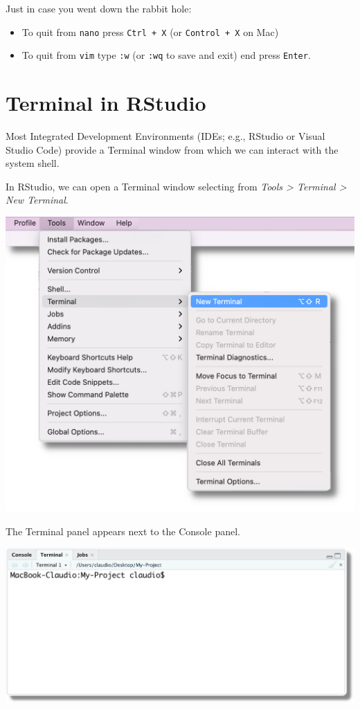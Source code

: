 \documentclass[
  11pt,
]{book}
\providecommand{\tightlist}{%
  \setlength{\itemsep}{0pt}\setlength{\parskip}{0pt}}
\begin{document}
Just in case you went down the rabbit hole:

\begin{itemize}
\tightlist
\item
  To quit from \texttt{nano} press \texttt{Ctrl\ +\ X} (or \texttt{Control\ +\ X} on Mac)
\item
  To quit from \texttt{vim} type \texttt{:w} (or \texttt{:wq} to save and exit) end press \texttt{Enter}.
\end{itemize}

\hypertarget{terminal-in-rstudio}{%
\section{Terminal in RStudio}\label{terminal-in-rstudio}}

Most Integrated Development Environments (IDEs; e.g., RStudio or Visual Studio Code) provide a Terminal window from which we can interact with the system shell.

In RStudio, we can open a Terminal window selecting from \emph{Tools \textgreater{} Terminal \textgreater{} New Terminal}.

\begin{center}\includegraphics[width=0.6\linewidth]{images/terminal/new-terminal} \end{center}

The Terminal panel appears next to the Console panel.

\begin{center}\includegraphics[width=0.8\linewidth]{images/terminal/terminal-panel} \end{center}
\end{document}
